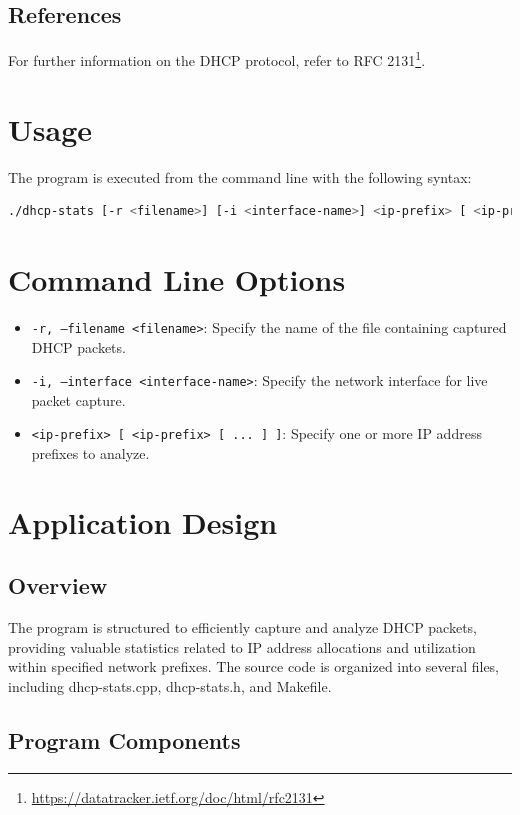 \documentclass[a4paper]{article}
\begin{document}
\subsection{References}

For further information on the DHCP protocol, refer to RFC 2131\footnote{\url{https://datatracker.ietf.org/doc/html/rfc2131}}.

\section{Usage}
The program is executed from the command line with the following syntax:
\begin{lstlisting}[language=bash]
./dhcp-stats [-r <filename>] [-i <interface-name>] <ip-prefix> [ <ip-prefix> [ ... ] ]
\end{lstlisting}

\section{Command Line Options}
\begin{itemize}
    \item \texttt{-r, --filename <filename>}: Specify the name of the file containing captured DHCP packets.
    \item \texttt{-i, --interface <interface-name>}: Specify the network interface for live packet capture.
    \item \texttt{<ip-prefix> [ <ip-prefix> [ ... ] ]}: Specify one or more IP address prefixes to analyze.
\end{itemize}

\section{Application Design}
\subsection{Overview}
The program is structured to efficiently capture and analyze DHCP packets, providing valuable statistics related to IP address allocations and utilization within specified network prefixes. The source code is organized into several files, including dhcp-stats.cpp, dhcp-stats.h, and Makefile.

\subsection{Program Components}
\end{document}
